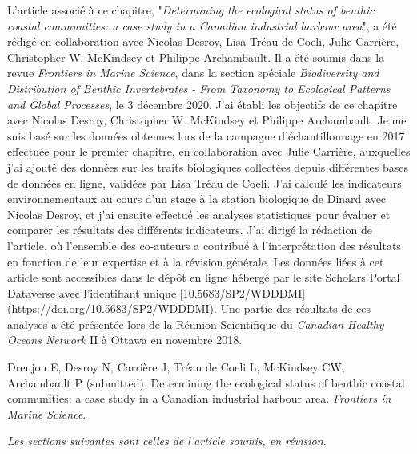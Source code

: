 L'article associé à ce chapitre, "\textit{Determining the ecological status of benthic coastal communities: a case study in a Canadian industrial harbour area}", a été rédigé en collaboration avec Nicolas Desroy, Lisa Tréau de Coeli, Julie Carrière, Christopher W. McKindsey et Philippe Archambault. Il a été soumis dans la revue \textit{Frontiers in Marine Science}, dans la section spéciale \textit{Biodiversity and Distribution of Benthic Invertebrates - From Taxonomy to Ecological Patterns and Global Processes}, le 3 décembre 2020. J'ai établi les objectifs de ce chapitre avec Nicolas Desroy, Christopher W. McKindsey et Philippe Archambault. Je me suis basé sur les données obtenues lors de la campagne d'échantillonnage en 2017 effectuée pour le premier chapitre, en collaboration avec Julie Carrière, auxquelles j'ai ajouté des données sur les traits biologiques collectées depuis différentes bases de données en ligne, validées par Lisa Tréau de Coeli. J'ai calculé les indicateurs environnementaux au cours d'un stage à la station biologique de Dinard avec Nicolas Desroy, et j'ai ensuite effectué les analyses statistiques pour évaluer et comparer les résultats des différents indicateurs. J'ai dirigé la rédaction de l'article, où l'ensemble des co-auteurs a contribué à l'interprétation des résultats en fonction de leur expertise et à la révision générale. Les données liées à cet article sont accessibles dans le dépôt en ligne hébergé par le site Scholars Portal Dataverse avec l'identifiant unique [10.5683/SP2/WDDDMI](https://doi.org/10.5683/SP2/WDDDMI). Une partie des résultats de ces analyses a été présentée lors de la Réunion Scientifique du \textit{Canadian Healthy Oceans Network} II à Ottawa en novembre 2018. \linebreak[4]

\begin{singlespace}
Dreujou E, Desroy N, Carrière J, Tréau de Coeli L, McKindsey CW, Archambault P (submitted). Determining the ecological status of benthic coastal communities: a case study in a Canadian industrial harbour area. \textit{Frontiers in Marine Science}.
\end{singlespace}

\textit{Les sections suivantes sont celles de l'article soumis, en révision.}
